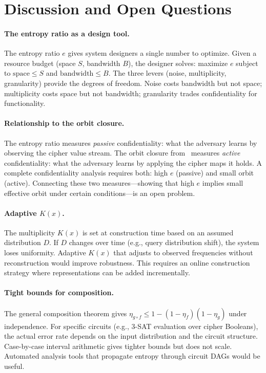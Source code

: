 \documentclass[11pt]{article}
\theoremstyle{definition}
\theoremstyle{plain}
\theoremstyle{remark}
\begin{document}
\section{Discussion and Open Questions}
\label{sec:discussion}

\paragraph{The entropy ratio as a design tool.}
The entropy ratio $e$ gives system designers a single number to optimize.
Given a resource budget (space $S$, bandwidth $B$), the designer solves:
maximize $e$ subject to $\text{space} \leq S$ and
$\text{bandwidth} \leq B$.  The three levers (noise, multiplicity,
granularity) provide the degrees of freedom.  Noise costs bandwidth but
not space; multiplicity costs space but not bandwidth; granularity trades
confidentiality for functionality.

\paragraph{Relationship to the orbit closure.}
The entropy ratio measures \emph{passive} confidentiality: what the
adversary learns by observing the cipher value stream.  The orbit closure
from~\cite{towell2026algebraic} measures \emph{active} confidentiality:
what the adversary learns by applying the cipher maps it holds.  A
complete confidentiality analysis requires both: high $e$ (passive) and
small orbit (active).  Connecting these two measures---showing that high
$e$ implies small effective orbit under certain conditions---is an open
problem.

\paragraph{Adaptive $K(x)$.}
The multiplicity $K(x)$ is set at construction time based on an assumed
distribution $D$.  If $D$ changes over time (e.g., query distribution
shift), the system loses uniformity.  Adaptive $K(x)$ that adjusts to
observed frequencies without reconstruction would improve robustness.
This requires an online construction strategy where representations can
be added incrementally.

\paragraph{Tight bounds for composition.}
The general composition theorem gives
$\eta_{g \circ f} \leq 1 - (1 - \eta_f)(1 - \eta_g)$ under
independence.  For specific circuits (e.g., 3-SAT evaluation over cipher
Booleans), the actual error rate depends on the input distribution and
the circuit structure.  Case-by-case interval arithmetic gives tighter
bounds but does not scale.  Automated analysis tools that propagate
entropy through circuit DAGs would be useful.
\end{document}
